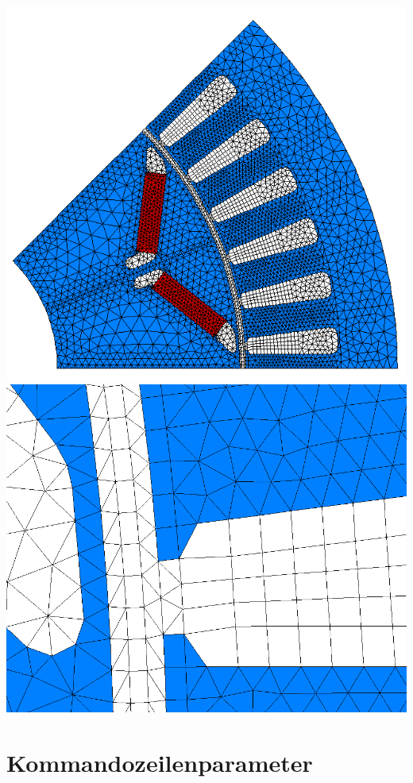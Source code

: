 \documentclass[10pt, a4paper,german]{scrartcl}
\begin{document}
\includegraphics[width=0.45\linewidth]{mesh}\hfill\includegraphics[width=0.45\linewidth]{airgap} 
%
\section{Kommandozeilenparameter}
\end{document}
